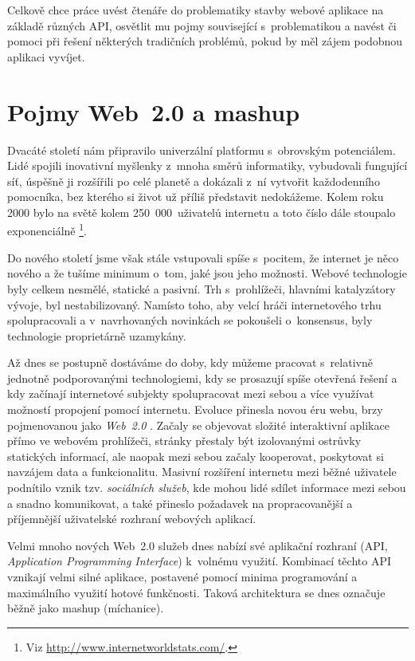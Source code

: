 Celkově chce práce uvést čtenáře do problematiky stavby webové
aplikace na základě různých API, osvětlit mu pojmy související
s~problematikou a navést či pomoci při řešení některých tradičních
problémů, pokud by měl zájem podobnou aplikaci vyvíjet.

\chapter{Pojmy Web~2.0 a mashup}\label{mashup}

Dvacáté století nám připravilo univerzální platformu s~obrovským
potenciálem. Lidé spojili inovativní myšlenky z~mnoha směrů informatiky,
vybudovali fungující síť, úspěšně ji rozšířili po celé planetě
a dokázali z~ní vytvořit každodenního pomocníka, bez kterého si život
už příliš představit nedokážeme. Kolem roku 2000 bylo na světě kolem
250~000~uživatelů internetu a toto číslo dále stoupalo exponenciálně
\footnote{Viz \url{http://www.internetworldstats.com/}.}.

Do nového století jsme však stále vstupovali spíše s~pocitem, že
internet je něco nového a že tušíme minimum o~tom, jaké jsou jeho
možnosti. Webové technologie byly celkem nesmělé, statické a pasivní.
Trh s~prohlížeči, hlavními katalyzátory vývoje, byl nestabilizovaný.
Namísto toho, aby velcí hráči internetového trhu spolupracovali a
v~navrhovaných novinkách se pokoušeli o~konsensus, byly technologie
proprietárně uzamykány.

Až dnes se postupně dostáváme do doby, kdy můžeme pracovat
s~relativně jednotně podporovanými technologiemi, kdy se prosazují
spíše otevřená řešení a kdy začínají internetové subjekty
spolupracovat mezi sebou a více využívat možností propojení pomocí
internetu. Evoluce přinesla novou éru webu, brzy pojmenovanou jako
{\it Web~2.0} \cite{web20}. Začaly se objevovat složité interaktivní
aplikace přímo ve webovém prohlížeči, stránky přestaly být izolovanými ostrůvky
statických informací, ale naopak mezi sebou začaly kooperovat,
poskytovat si navzájem data a funkcionalitu. Masivní rozšíření
internetu mezi běžné uživatele podnítilo vznik tzv. {\it sociálních
služeb}, kde mohou lidé sdílet informace mezi sebou a snadno
komunikovat, a také přineslo požadavek na propracovanější a
příjemnější uživatelské rozhraní webových aplikací.

Velmi mnoho nových Web~2.0 služeb dnes nabízí své aplikační
rozhraní (API, {\it Application Programming Interface}) k~volnému
využití. Kombinací těchto API vznikají velmi silné aplikace, postavené
pomocí minima programování a maximálního využití hotové funkčnosti.
Taková architektura se dnes označuje běžně jako mashup (míchanice).

